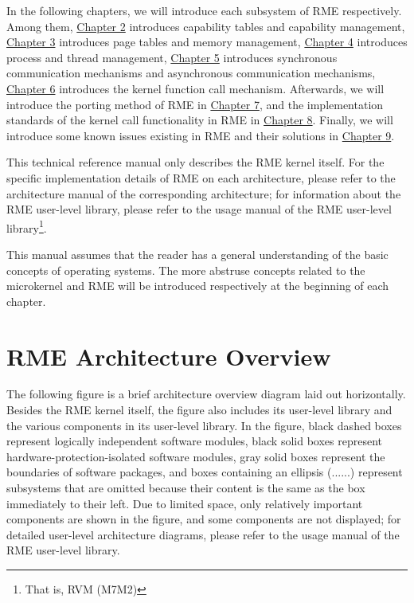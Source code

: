 In the following chapters, we will introduce each subsystem of RME respectively. Among them, \hyperref[sec:2-capability-concept]{Chapter 2}
introduces capability tables and capability management, \hyperref[sec:3-memory-management-overview]{Chapter 3}
introduces page tables and memory management, \hyperref[sec:4-process-and-thread-overview]{Chapter 4}
introduces process and thread management, \hyperref[sec:5-sync-async-overview]{Chapter 5}
introduces synchronous communication mechanisms and asynchronous communication mechanisms, \hyperref[sec:6-kernel-call-overview]{Chapter 6}
introduces the kernel function call mechanism. Afterwards, we will introduce the porting method of RME in \hyperref[sec:7-porting-overview]{Chapter 7}, and the implementation standards of the kernel call functionality in RME in \hyperref[sec:8-kernel-call-implementation-overview]{Chapter 8}. Finally, we will introduce some known issues existing in RME and their solutions in \hyperref[sec:9-special-kernel-features]{Chapter 9}.

This technical reference manual only describes the RME kernel itself. For the specific implementation details of RME on each architecture, please refer to the architecture manual of the corresponding architecture; for information about the RME user-level library, please refer to the usage manual of the RME user-level library\footnote{That is, RVM (M7M2)}.

This manual assumes that the reader has a general understanding of the basic concepts of operating systems. The more abstruse concepts related to the microkernel and RME will be introduced respectively at the beginning of each chapter.

\section{RME Architecture Overview}\label{sec:1-architecture-overview}

The following figure is a brief architecture overview diagram laid out horizontally. Besides the RME kernel itself, the figure also includes its user-level library and the various components in its user-level library. In the figure, black dashed boxes represent logically independent software modules, black solid boxes represent hardware-protection-isolated software modules, gray solid boxes represent the boundaries of software packages, and boxes containing an ellipsis (......) represent subsystems that are omitted because their content is the same as the box immediately to their left. Due to limited space, only relatively important components are shown in the figure, and some components are not displayed; for detailed user-level architecture diagrams, please refer to the usage manual of the RME user-level library.

